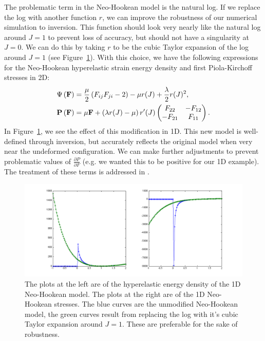 The problematic term in the Neo-Hookean model is the natural log. If we replace the log with another function $r$, we can improve the robustness of our numerical simulation to inversion. This function should look very nearly like the natural log around $J = 1$ to prevent loss of accuracy, but should not have a singularity at $J = 0$. We can do this by taking $r$ to be the cubic Taylor expansion of the log around $J = 1$ (see Figure~\ref{fig:inversion3}). With this choice, we have the following expressions for the Neo-Hookean hyperelastic strain energy density and first Piola-Kirchoff stresses in 2D:
\begin{align*}
\Psi \left( \mathbf{F} \right) & = \frac{\mu}{2} \left( F_{ij} F_{ji} - 2 \right) - \mu r(J) + \frac{\lambda}{2} r(J)^2, \\
\mathbf{P} \left( \mathbf{F} \right) & = \mu \mathbf{F} + \left( \lambda r(J) -\mu \right) r'(J) \begin{pmatrix} F_{22} & -F_{12} \\
-F_{21} & F_{11} \end{pmatrix}.
\end{align*}
In Figure~\ref{fig:inversion3}, we see the effect of this modification in 1D. This new model is well-defined through inversion, but accurately reflects the original model when very near the undeformed configuration. We can make further adjustments to prevent problematic values of $\frac{\partial P}{\partial F}$ (e.g. we wanted this to be positive for our 1D example). The treatment of these terms is addressed in \cite{Teran05a}.

\begin{figure}
\includegraphics[width=\textwidth]{images/invertible_neo_hookean}
\caption{The plots at the left are of the hyperelastic energy density of the 1D Neo-Hookean model. The plots at the right are of the 1D Neo-Hookean stresses. The blue curves are the unmodified Neo-Hookean model, the green curves result from replacing the log with it's cubic Taylor expansion around $J = 1$. These are preferable for the sake of robustness.}
\label{fig:inversion3}
\end{figure}

